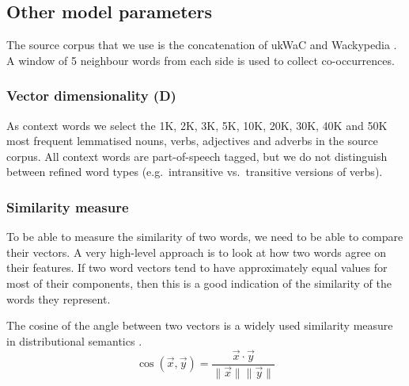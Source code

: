 \subsection{Other model parameters}
\label{sec:other-model-paramt}



The source corpus that we use is the concatenation of ukWaC and Wackypedia \cite{ukwac}.\footnotemark{} A window of 5 neighbour words from each side is used to collect co-occurrences.
%
%


\subsubsection{Vector dimensionality (D)}
\label{sec:vect-dimens}

As context words we select the 1K, 2K, 3K, 5K, 10K, 20K, 30K, 40K and 50K most frequent lemmatised nouns, verbs, adjectives and adverbs in the source corpus. All context words are part-of-speech tagged, but we do not distinguish between refined word types (e.g.~intransitive vs.~transitive versions of verbs).

\subsubsection{Similarity measure}
\label{sec:similarity-measure}

To be able to measure the similarity of two words, we need to be able to compare their vectors.\footnotemark{} A very high-level approach is to look at how two words agree on their features. If two word vectors tend to have approximately equal values for most of their components, then this is a good indication of the similarity of the words they represent.


The cosine of the angle between two vectors is a widely used similarity measure in distributional semantics \cite{Turney:2010:FMV:1861751.1861756,lapesa2014large}.
%
\begin{equation}
  \label{eq:cos}
  \cos(\vec{x}, \vec{y}) = \frac{\vec{x} \cdot \vec{y}}
                                {\|\vec{x}\| \|\vec{y}\|}
\end{equation}


